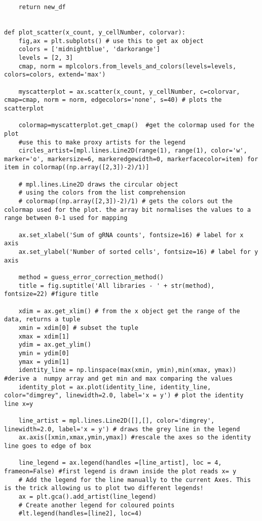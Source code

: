 \begin{footnotesize}
\begin{lstlisting}
    return new_df


def plot_scatter(x_count, y_cellNumber, colorvar):
    fig,ax = plt.subplots() # use this to get ax object
    colors = ['midnightblue', 'darkorange']
    levels = [2, 3]
    cmap, norm = mplcolors.from_levels_and_colors(levels=levels, colors=colors, extend='max')

    myscatterplot = ax.scatter(x_count, y_cellNumber, c=colorvar, cmap=cmap, norm = norm, edgecolors='none', s=40) # plots the scatterplot

    colormap=myscatterplot.get_cmap()  #get the colormap used for the plot
    #use this to make proxy artists for the legend
    circles_artist=[mpl.lines.Line2D(range(1), range(1), color='w', marker='o', markersize=6, markeredgewidth=0, markerfacecolor=item) for item in colormap((np.array([2,3])-2)/1)]

    # mpl.lines.Line2D draws the circular object
    # using the colors from the list comprehension
    # colormap((np.array([2,3])-2)/1) # gets the colors out the colormap used for the plot. the array bit normalises the values to a range between 0-1 used for mapping

    ax.set_xlabel('Sum of gRNA counts', fontsize=16) # label for x axis
    ax.set_ylabel('Number of sorted cells', fontsize=16) # label for y axis

    method = guess_error_correction_method()
    title = fig.suptitle('All libraries - ' + str(method), fontsize=22) #figure title

    xdim = ax.get_xlim() # from the x object get the range of the data, returns a tuple
    xmin = xdim[0] # subset the tuple
    xmax = xdim[1]
    ydim = ax.get_ylim()
    ymin = ydim[0]
    ymax = ydim[1]
    identity_line = np.linspace(max(xmin, ymin),min(xmax, ymax)) #derive a  numpy array and get min and max comparing the values
    identity_plot = ax.plot(identity_line, identity_line, color="dimgrey", linewidth=2.0, label='x = y') # plot the identity line x=y

    line_artist = mpl.lines.Line2D([],[], color='dimgrey', linewidth=2.0, label='x = y') # draws the grey line in the legend
    ax.axis([xmin,xmax,ymin,ymax]) #rescale the axes so the identity line goes to edge of box

    line_legend = ax.legend(handles =[line_artist], loc = 4, frameon=False) #first legend is drawn inside the plot reads x= y
    # Add the legend for the line manually to the current Axes. This is the trick allowing us to plot two different legends!
    ax = plt.gca().add_artist(line_legend)
    # Create another legend for coloured points
    #lt.legend(handles=[line2], loc=4)


\end{lstlisting}
\end{footnotesize}
